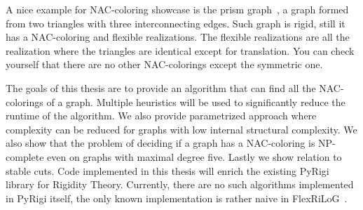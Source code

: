 A nice example for NAC-coloring showcase is the prism graph~,
a graph formed from two triangles with three interconnecting edges.
Such graph is rigid, still it has a NAC-coloring and flexible realizations.
The flexible realizations are all the realization where
the triangles are identical except for translation.
You can check yourself that there are
no other NAC-colorings except the symmetric one.

The goals of this thesis are to provide an algorithm
that can find all the NAC-colorings of a graph.
Multiple heuristics will be used to significantly
reduce the runtime of the algorithm.
We also provide parametrized approach where complexity can be reduced for graphs
with low internal structural complexity.
We also show that the problem of deciding if a graph has a NAC-coloring
is NP-complete even on graphs with maximal degree five.
Lastly we show relation to stable cuts.
Code implemented in this thesis will enrich the existing PyRigi~\cite{pyrigi}
library for Rigidity Theory.
Currently, there are no such algorithms implemented in PyRigi itself,
the only known implementation is rather naive in FlexRiLoG~\cite{flexrilog}.

